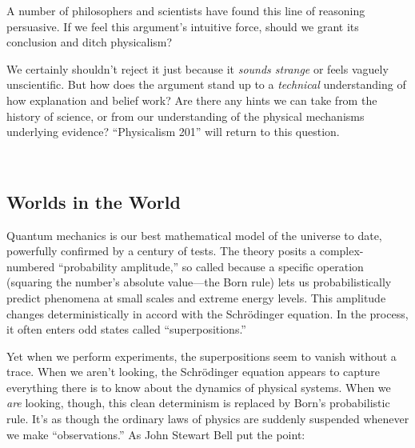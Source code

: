 {
 A number of philosophers and scientists have found this line of
reasoning persuasive. If we feel this
argument's intuitive force, should we grant its
conclusion and ditch physicalism?}

{
 We certainly shouldn't reject it just because it
\textit{sounds strange} or feels vaguely unscientific. But how does the
argument stand up to a \textit{technical} understanding of how
explanation and belief work? Are there any hints we can take from the
history of science, or from our understanding of the physical
mechanisms underlying evidence? ``Physicalism
201'' will return to this question.}

{
 ~}

\subsection{Worlds in the World}

{
 Quantum mechanics is our best mathematical model of the universe
to date, powerfully confirmed by a century of tests. The theory posits
a complex-numbered ``probability
amplitude,'' so called because a specific operation
(squaring the number's absolute value---the Born rule)
lets us probabilistically predict phenomena at small scales and extreme
energy levels. This amplitude changes deterministically in accord with
the Schrödinger equation. In the process, it often enters odd states
called ``superpositions.''}

{
 Yet when we perform experiments, the superpositions seem to vanish
without a trace. When we aren't looking, the
Schrödinger equation appears to capture everything there is to know
about the dynamics of physical systems. When we \textit{are} looking,
though, this clean determinism is replaced by Born's
probabilistic rule. It's as though the ordinary laws of
physics are suddenly suspended whenever we make
``observations.'' As John Stewart
Bell put the point:}

